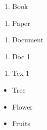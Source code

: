 \documentclass{book}
\begin{document}
\begin{enumerate}[1]
\item Book

 
\end{enumerate}
\begin{enumerate}[1, start=2]
\item Paper

 
\end{enumerate}
\begin{enumerate}[1, start=3]
\item Document

 
\end{enumerate}
\begin{enumerate}[a]
\item Doc 1

 
\end{enumerate}
\begin{enumerate}[a, start=2]
\item Tex 1

 
\end{enumerate}
\begin{itemize}
\item Tree

 
\end{itemize}
\begin{itemize}
\item Flower

 
\end{itemize}
\begin{itemize}
\item Fruits

 
\end{itemize}
\end{document}
